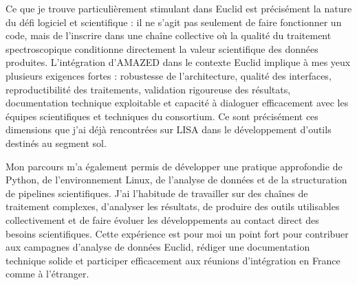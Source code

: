 \documentclass[11pt,a4paper]{altacv}
\begin{document}
{{Ce que je trouve particulièrement stimulant dans Euclid est précisément la nature du défi logiciel et scientifique : il ne s'agit pas seulement de faire fonctionner un code, mais de l'inscrire dans une chaîne collective où la qualité du traitement spectroscopique conditionne directement la valeur scientifique des données produites. L'intégration d'AMAZED dans le contexte Euclid implique à mes yeux plusieurs exigences fortes : robustesse de l'architecture, qualité des interfaces, reproductibilité des traitements, validation rigoureuse des résultats, documentation technique exploitable et capacité à dialoguer efficacement avec les équipes scientifiques et techniques du consortium. Ce sont précisément ces dimensions que j'ai déjà rencontrées sur LISA dans le développement d'outils destinés au segment sol.

Mon parcours m'a également permis de développer une pratique approfondie de Python, de l'environnement Linux, de l'analyse de données et de la structuration de pipelines scientifiques. J'ai l'habitude de travailler sur des chaînes de traitement complexes, d'analyser les résultats, de produire des outils utilisables collectivement et de faire évoluer les développements au contact direct des besoins scientifiques. Cette expérience est pour moi un point fort pour contribuer aux campagnes d'analyse de données Euclid, rédiger une documentation technique solide et participer efficacement aux réunions d'intégration en France comme à l'étranger.


}}
\end{document}
